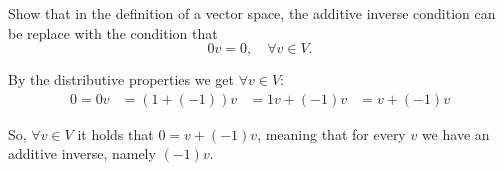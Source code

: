 \begin{xrcs}
  Show that in the definition of a vector space, the additive inverse condition can be replace with the condition that
  \[
    0v = 0, \quad \forall v \in V.
  \]

  \begin{xprf}
    By the distributive properties we get $\forall v \in V:$
    \[
    \begin{aligned}
      0 = 0v &= (1 + (-1))v
      &= 1v + (-1)v
      &= v + (-1)v
    \end{aligned}
    \]

    So, $\forall v \in V$ it holds that $0= v + (-1)v$, meaning that for every $v$ we have an additive inverse, namely $(-1)v$.
  \end{xprf}
\end{xrcs}
